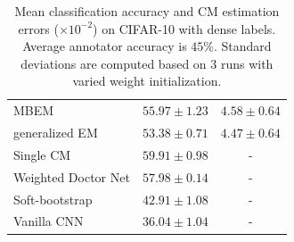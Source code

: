 \begin{table}[h]
\begin{subtable}[t]{0.45\linewidth}
\begin{tabular}{lcc}
            MBEM \cite{khetan2017learning}              & $55.97 \pm 1.23$ & $4.58\pm0.64$ \\
            generalized EM \cite{raykar2009supervised}  & $53.38 \pm 0.71$ & $4.47\pm0.64$  \\
            \midrule
            Single CM \cite{sukhbaatar2014training}  & $59.91 \pm 0.98$  & -   \\
            Weighted Doctor Net \cite{guan2017said}     & $57.98\pm0.14$ &  -  \\
            Soft-bootstrap \cite{reed2014training}      & $42.91\pm1.08$ & -    \\
            Vanilla CNN \cite{reed2014training}         & $36.04\pm1.04 $ & -    \\
        \hline
        \end{tabular}
    \end{subtable}
\caption{\small Mean classification accuracy and CM estimation errors ($\times 10^{-2}$) on CIFAR-10 with dense labels. Average annotator accuracy is $45\%$. Standard deviations are computed based on 3 runs with varied weight initialization.}
\label{tab:cifar10}
\end{table}

